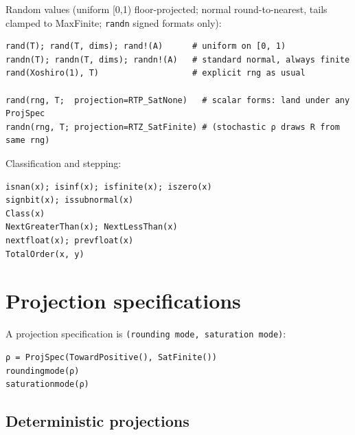 Random values (uniform [0,1) floor-projected; normal round-to-nearest, tails clamped to MaxFinite; \texttt{randn} signed formats only):




\begin{verbatim}
rand(T); rand(T, dims); rand!(A)      # uniform on [0, 1)
randn(T); randn(T, dims); randn!(A)   # standard normal, always finite
rand(Xoshiro(1), T)                   # explicit rng as usual

rand(rng, T;  projection=RTP_SatNone)   # scalar forms: land under any ProjSpec
randn(rng, T; projection=RTZ_SatFinite) # (stochastic ρ draws R from same rng)
\end{verbatim}



Classification and stepping:




\begin{verbatim}
isnan(x); isinf(x); isfinite(x); iszero(x)
signbit(x); issubnormal(x)
Class(x)
NextGreaterThan(x); NextLessThan(x)
nextfloat(x); prevfloat(x)
TotalOrder(x, y)
\end{verbatim}



\section{Projection specifications}



\label{714366806163910976}{}


A projection specification is \texttt{(rounding mode, saturation mode)}:




\begin{verbatim}
ρ = ProjSpec(TowardPositive(), SatFinite())
roundingmode(ρ)
saturationmode(ρ)
\end{verbatim}



\subsection{Deterministic projections}



\label{18424161794924729217}{}



